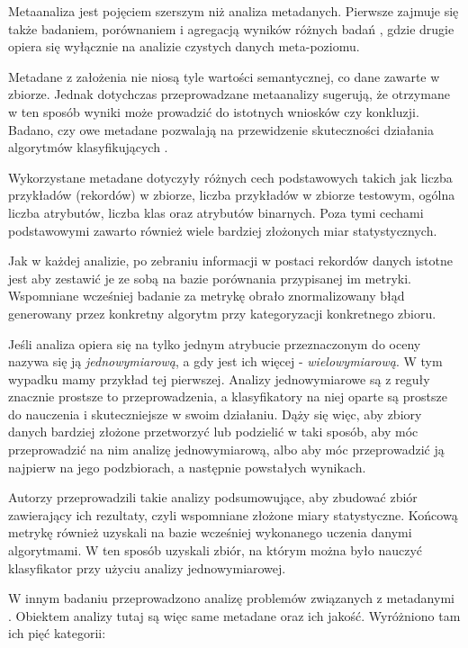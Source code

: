 	Metaanaliza jest pojęciem szerszym niż analiza metadanych.
	Pierwsze zajmuje się także badaniem, porównaniem i agregacją wyników różnych badań \cite{rosenthal2002meta}, gdzie drugie opiera się wyłącznie na analizie czystych danych meta-poziomu.

	Metadane z założenia nie niosą tyle wartości semantycznej, co dane zawarte w zbiorze.
	Jednak dotychczas przeprowadzane metaanalizy sugerują, że otrzymane w ten sposób wyniki może prowadzić do istotnych wniosków czy konkluzji.
	Badano, czy owe metadane pozwalają na przewidzenie skuteczności działania algorytmów klasyfikujących \cite{brazdil1994characterizing}.

	Wykorzystane metadane dotyczyły różnych cech podstawowych takich jak liczba przykładów (rekordów) w zbiorze, liczba przykładów w zbiorze testowym, ogólna liczba atrybutów, liczba klas oraz atrybutów binarnych. Poza tymi cechami podstawowymi zawarto również wiele bardziej złożonych miar statystycznych.

	Jak w każdej analizie, po zebraniu informacji w postaci rekordów danych istotne jest aby zestawić je ze sobą na bazie porównania przypisanej im metryki.
	Wspomniane wcześniej badanie \cite{brazdil1994characterizing} za metrykę obrało znormalizowany błąd generowany przez konkretny algorytm przy kategoryzacji konkretnego zbioru.

	Jeśli analiza opiera się na tylko jednym atrybucie przeznaczonym do oceny nazywa się ją \emph{jednowymiarową}, a gdy jest ich więcej - \emph{wielowymiarową}.
	W tym wypadku mamy przykład tej pierwszej.
	Analizy jednowymiarowe są z reguły znacznie prostsze to przeprowadzenia, a klasyfikatory na niej oparte są prostsze do nauczenia i skuteczniejsze w swoim działaniu.
	Dąży się więc, aby zbiory danych bardziej złożone przetworzyć lub podzielić w taki sposób, aby móc przeprowadzić na nim analizę jednowymiarową, albo aby móc przeprowadzić ją najpierw na jego podzbiorach, a następnie powstałych wynikach.

	Autorzy przeprowadzili takie analizy podsumowujące, aby zbudować zbiór zawierający ich rezultaty, czyli wspomniane złożone miary statystyczne.
	Końcową metrykę również uzyskali na bazie wcześniej wykonanego uczenia danymi algorytmami.
	W ten sposób uzyskali zbiór, na którym można było nauczyć klasyfikator przy użyciu analizy jednowymiarowej.

	W innym badaniu przeprowadzono analizę problemów związanych z metadanymi \cite{yasser2011analysis}.
	Obiektem analizy tutaj są więc same metadane oraz ich jakość.
	Wyróżniono tam ich pięć kategorii:

